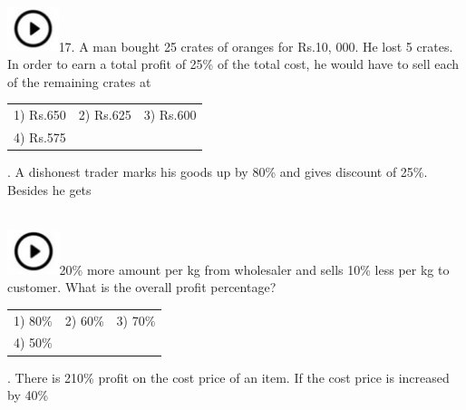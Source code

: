 \documentclass{article} %
\begin{document}
\noindent  
\noindent \\ \includegraphics*[width=0.59in, height=0.52in]{images/image1}17. A man bought 25 crates of oranges for Rs.10, 000. He lost 5 crates. In order to earn a total profit of 25\% of the total cost, he would have to sell each of the remaining crates at

\noindent 
\begin{tabular}{p{1.7in} p{1.6in} p{1.6in}} \\ 
	1) Rs.650                 &  2) Rs.625          &  3) Rs.600          \\
4) Rs.575 \\
\end{tabular}

\noindent 

\noindent 

\noindent 

\noindent 

\noindent 

\noindent 

\noindent 

\noindent 

. A dishonest trader marks his goods up by 80\% and gives discount of 25\%. Besides he gets

\noindent  
\noindent \\ \includegraphics*[width=0.60in, height=0.52in]{images/image1}20\% more amount per kg from wholesaler and sells 10\% less per kg to customer. What is the overall profit percentage?

\noindent 

\noindent 
\begin{tabular}{p{1.7in} p{1.6in} p{1.6in}} \\ 
	1) 80\%                    &  2) 60\%              &  3) 70\%              \\
4) 50\% \\
\end{tabular}

\noindent 

\noindent 

\noindent 

. There is 210\% profit on the cost price of an item. If the cost price is increased by 40\%
\end{document}
